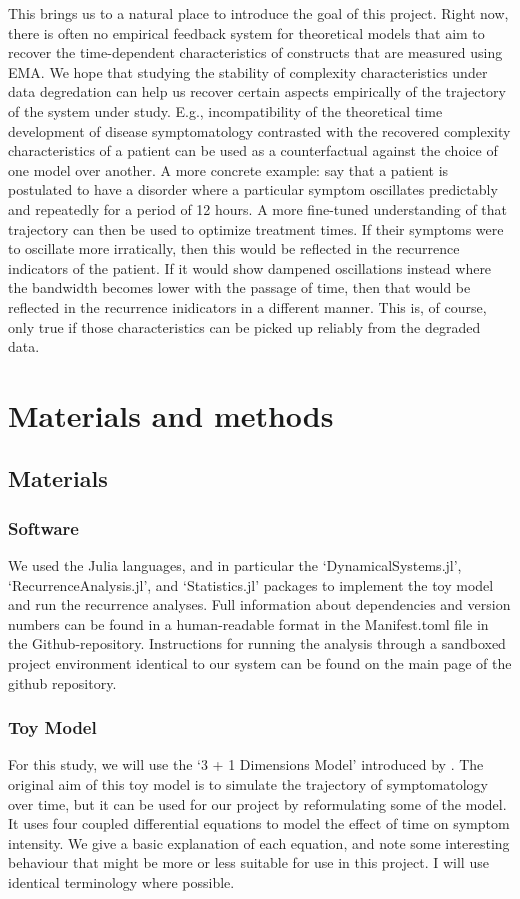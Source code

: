 \documentclass[utf8]{FrontiersinVancouver}
\begin{document}
This brings us to a natural place to introduce the goal of this project. Right now, there is often no empirical feedback system for theoretical models that aim to recover the time-dependent characteristics of constructs that are measured using EMA\@. We hope that studying the stability of complexity characteristics under data degredation can help us recover certain aspects empirically of the trajectory of the system under study. E.g., incompatibility of the theoretical time development of disease symptomatology contrasted with the recovered complexity characteristics of a patient can be used as a counterfactual against the choice of one model over another. A more concrete example: say that a patient is postulated to have a disorder where a particular symptom oscillates predictably and repeatedly for a period of 12 hours. A more fine-tuned understanding of that trajectory can then be used to optimize treatment times. If their symptoms were to oscillate more irratically, then this would be reflected in the recurrence indicators of the patient. If it would show dampened oscillations instead where the bandwidth becomes lower with the passage of time, then that would be reflected in the recurrence inidicators in a different manner. This is, of course, only true if those characteristics can be picked up reliably from the degraded data. 

\section{Materials and methods}

\subsection{Materials}

\subsubsection{Software}
We used the Julia languages, and in particular the `DynamicalSystems.jl', `RecurrenceAnalysis.jl', and `Statistics.jl' packages to implement the toy model and run the recurrence analyses. Full information about dependencies and version numbers can be found in a human-readable format in the Manifest.toml file in the Github-repository. Instructions for running the analysis through a sandboxed project environment identical to our system can be found on the main page of the github repository.

\subsubsection{Toy Model}
For this study, we will use the `3 + 1 Dimensions Model' introduced by \citep{gauldDynamicalSystemsComputational2023}. The original aim of this toy model is to simulate the trajectory of symptomatology over time, but it can be used for our project by reformulating some of the model.  It uses four coupled differential equations to model the effect of time on symptom intensity. We give a basic explanation of each equation, and note some interesting behaviour that might be more or less suitable for use in this project. I will use identical terminology where possible. 
\end{document}
